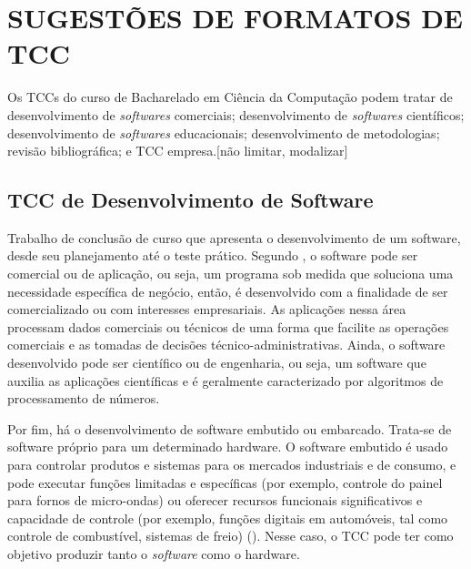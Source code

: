 \section{SUGESTÕES DE FORMATOS DE TCC}\label{sec:SUGESTOESTCC}
Os TCCs do curso de Bacharelado em Ciência da Computação podem tratar de desenvolvimento de \textit{softwares} comerciais; desenvolvimento de \textit{softwares} científicos; desenvolvimento de \textit{softwares} educacionais; desenvolvimento de metodologias; revisão bibliográfica; e TCC empresa.[não limitar, modalizar]

\subsection{TCC de Desenvolvimento de Software}\label{sec:DesenvolvimentoSof}
Trabalho de conclusão de curso que apresenta o desenvolvimento de um software, desde seu planejamento até o teste prático. Segundo \cite{Pressman2011}, o software pode ser comercial ou de aplicação, ou seja, um programa sob medida que soluciona uma necessidade específica de negócio, então, é desenvolvido com a finalidade de ser comercializado ou com interesses empresariais. As aplicações nessa área processam dados comerciais ou técnicos de uma forma que facilite as operações comerciais e as tomadas de decisões técnico-administrativas. Ainda, o software desenvolvido pode ser científico ou de engenharia, ou seja, um software que auxilia as aplicações científicas e é geralmente caracterizado por algoritmos de processamento de números. 

Por fim, há o desenvolvimento de software embutido ou embarcado. Trata-se de software próprio para um determinado hardware. O software embutido é usado para controlar produtos e sistemas para os mercados industriais e de consumo, e pode executar funções limitadas e específicas (por exemplo, controle do painel para fornos de micro-ondas) ou oferecer recursos funcionais significativos e capacidade de controle (por exemplo, funções digitais em automóveis, tal como controle de combustível, sistemas de freio) (\cite{Pressman2011}). Nesse caso, o TCC pode ter como objetivo produzir tanto o \textit{software} como o hardware.

